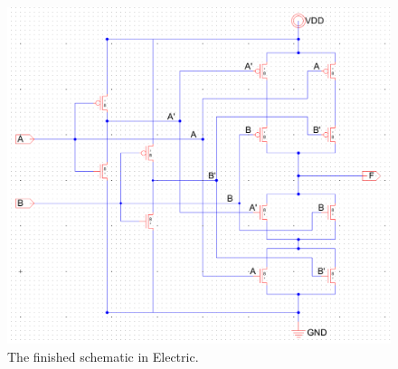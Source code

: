 \documentclass{article}
\begin{document}
  \begin{figure}[H]
    \centering
    \includegraphics[width=0.9\linewidth, frame]{screenshots/schematic.png}
    \caption{The finished schematic in Electric.}
    \label{fig:schem}
  \end{figure}

\end{document}
